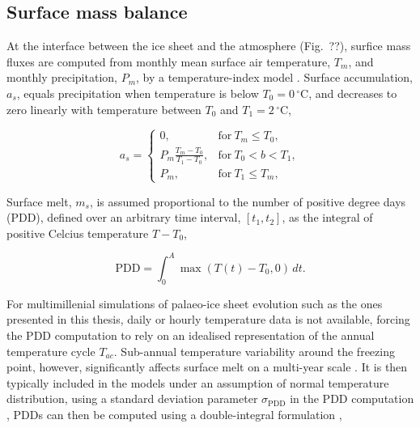 \documentclass{article}
\newcommand{\unit}[1]{\ensuremath{\mathrm{#1}}}
\newcommand{\degree}[0]{\ensuremath{^{\circ}}}
\newcommand{\degC}[0]{\unit{{\degree}C}}
\begin{document}
\subsection{Surface mass balance}

\newcommand{\PDD}[0]{\mathrm{PDD}}
\newcommand{\sPDD}[0]{\sigma_{\mathrm{PDD}}}

At the interface between the ice sheet and the atmosphere (Fig.~??),
surfice mass fluxes are computed from monthly mean surface air temperature,
$T_m$, and monthly precipitation, $P_m$, by a temperature-index model
\citep[e.g.,][]{Hock.2003}. Surface accumulation, $a_s$, equals precipitation
when temperature is below ${T_0=0\,\degC}$, and decreases to zero linearly
with temperature between $T_0$ and ${T_1=2\,\degC}$,

\begin{equation}
    a_s =
    \begin{cases}
        0,      & \mathrm{for}\ T_m \le T_0, \\
        P_m \frac{T_m-T_0}{T_1-T_0},
                & \mathrm{for}\ T_0 < b < T_1, \\
        P_m,    & \mathrm{for}\ T_1 \le T_m,
    \end{cases}
\end{equation}

Surface melt, $m_s$, is assumed proportional to the number of positive degree
days (PDD), defined over an arbitrary time interval, $[t_1, t_2]$, as the
integral of positive Celcius temperature $T-T_0$,

\begin{equation}
    \mathrm{PDD} = \int_{0}^{A}\max(T(t)-T_0,0)\,dt.
\end{equation}

For multimillenial simulations of palaeo-ice sheet evolution such as the ones
presented in this thesis, daily or hourly temperature data is not available,
forcing the PDD computation to rely on an idealised representation of the
annual temperature cycle $T_{ac}$. Sub-annual temperature variability around
the freezing point, however, significantly affects surface melt on a multi-year
scale \citep{Arnold.Mackay.1964}. It is then typically included in the models
under an assumption of normal temperature distribution, using a standard
deviation parameter $\sPDD$ in the PDD computation \citep{Braithwaite.1984},
PDDs can then be computed using a double-integral formulation
\citep{Reeh.1991},
\end{document}
